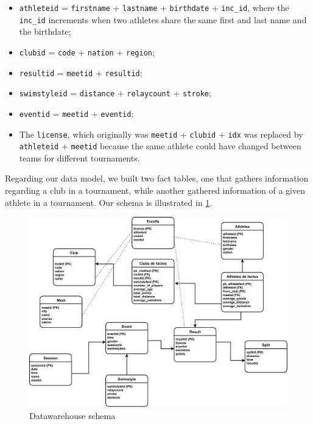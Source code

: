 \documentclass[a4paper, 11pt]{article}
\begin{document}
    \begin{itemize}
        \item \texttt{athleteid} = \texttt{firstname} + \texttt{lastname} + \texttt{birthdate} + \texttt{inc\_id}, where the
        \texttt{inc\_id} increments when two athletes share the same first and last name and the birthdate;
        \item \texttt{clubid} = \texttt{code} + \texttt{nation} + \texttt{region};
        \item \texttt{resultid} = \texttt{meetid} + \texttt{resultid};
        \item \texttt{swimstyleid} = \texttt{distance} + \texttt{relaycount} + \texttt{stroke};
        \item \texttt{eventid} = \texttt{meetid} + \texttt{eventid};
        \item The \texttt{license}, which originally was \texttt{meetid} + \texttt{clubid} + \texttt{idx} was replaced by
        \texttt{athleteid} + \texttt{meetid} because the same athlete could have changed between teams for different
        tournaments.
    \end{itemize}

    Regarding our data model, we built two fact tables, one that gathers information regarding a club in a tournament, while
    another gathered information of a given athlete in a tournament.
    Our schema is illustrated in \cref{fig:defact}.

    \begin{figure}[H]
        \centering
        \includegraphics[width=\textwidth]{img/datawarehouse}
        \caption{Datawarehouse schema}
        \label{fig:defact}
    \end{figure}
\end{document}
